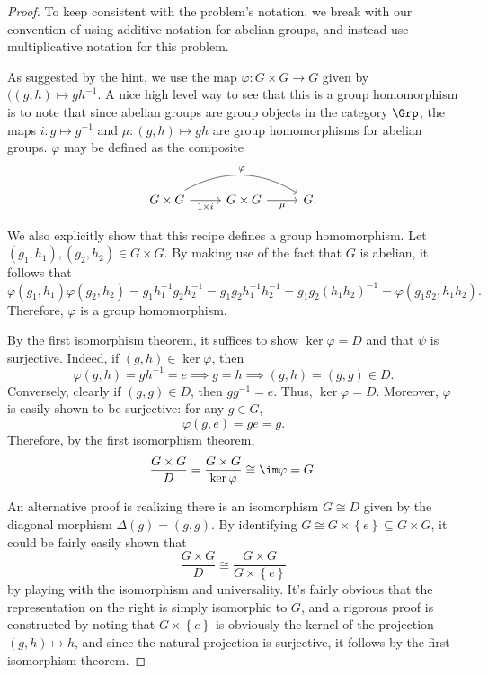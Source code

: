 \documentclass[11pt, letterpaper]{article}
\theoremstyle{plain}
\begin{document}
\begin{proof}
	To keep consistent with the problem's notation, we break with our convention of using additive notation for abelian groups, and instead use multiplicative notation for this problem.

	As suggested by the hint, we use the map $\varphi : G\times G \to G$ given by $((g,h)\mapsto gh^{-1} $. A nice high level way to see that this is a group homomorphism is to note that since abelian groups are group objects in the category $\Grp $, the maps $i:g\mapsto g^{-1} $ and $\mu :(g,h)\mapsto gh$ are group homomorphisms for abelian groups. $\varphi $ may be defined as the composite
	\[\begin{tikzcd}[row sep = 2.5em, column sep = 2.5em]
	G\times G \ar[" \varphi  ", bend left, rr] \ar[" 1 \times i  "', r]  & G\times G \ar[" \mu  "', r]  & G.
	\end{tikzcd}\]

	We also explicitly show that this recipe defines a group homomorphism. Let $(g_1,h_1),(g_2,h_2)\in G\times G$. By making use of the fact that $G$ is abelian, it follows that
	\[
		\varphi (g_1,h_1)\varphi (g_2,h_2)=g_1 h_1^{-1} g_2h_2^{-1} =g_1g_2h_1^{-1} h_2^{-1} =g_1g_2(h_1h_2)^{-1} =\varphi (g_1g_2,h_1h_2)
	.\]
	Therefore, $\varphi $ is a group homomorphism.

	By the first isomorphism theorem, it suffices to show $\ker \varphi =D$ and that $\psi$ is surjective. Indeed, if $(g,h)\in \ker \varphi $, then
	\[
		\varphi (g,h)=gh^{-1} =e \implies g=h \implies (g,h)=(g,g)\in D
	.\]
	Conversely, clearly if $(g,g)\in D$, then $gg^{-1} =e$. Thus, $\ker \varphi =D$. Moreover, $\varphi $ is easily shown to be surjective: for any $g\in G$,
	\[
		\varphi (g,e)=ge =g
	.\]
	Therefore, by the first isomorphism theorem,
	\[
		\frac{G\times G}{D} =\frac{G\times G}{\ker \varphi } \cong \im \varphi =G
	.\]

	An alternative proof is realizing there is an isomorphism $G\cong D$ given by the diagonal morphism $\Delta (g)=(g,g)$. By identifying $G\cong G\times \left\{ e \right\} \subseteq G\times G$, it could be fairly easily shown that
	\[
		\frac{G\times G}{D} \cong \frac{G\times G}{G\times \left\{ e \right\} } 
	\]
	by playing with the isomorphism and universality. It's fairly obvious that the representation on the right is simply isomorphic to $G$, and a rigorous proof is constructed by noting that $G\times \left\{ e \right\} $ is obviously the kernel of the projection $(g,h)\mapsto h$, and since the natural projection is surjective, it follows by the first isomorphism theorem.
\end{proof}
\end{document}
